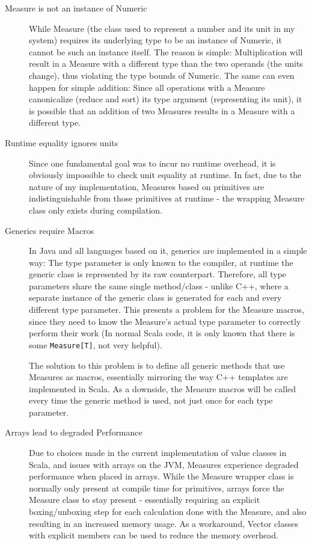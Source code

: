 \documentclass[12pt,oneside,a4paper]{scrbook}
\begin{document}
\begin{description}
  \item[Measure is not an instance of Numeric] While Measure (the class used to represent a number and its unit in my system) requires its underlying type to be an instance of Numeric, it cannot be such an instance itself. The reason is simple: Multiplication will result in a Measure with a different type than the two operands (the units change), thus violating the type bounds of Numeric. The same can even happen for simple addition: Since all operations with a Measure canonicalize (reduce and sort) its type argument (representing its unit), it is possible that an addition of two Measures results in a Measure with a different type.

  \item[Runtime equality ignores units] Since one fundamental goal was to incur no runtime overhead, it is obviously impossible to check unit equality at runtime. In fact, due to the nature of my implementation, Measures based on primitives are indistinguishable from those primitives at runtime - the wrapping Measure class only exists during compilation.

  \item[Generics require Macros] In Java and all languages based on it, generics are implemented in a simple way: The type parameter is only known to the compiler, at runtime the generic class is represented by its raw counterpart. Therefore, all type parameters share the same single method/class - unlike C++, where a separate instance of the generic class is generated for each and every different type parameter. This presents a problem for the Measure macros, since they need to know the Measure's actual type parameter to correctly perform their work (In normal Scala code, it is only known that there is some \verb|Measure[T]|, not very helpful).

  The solution to this problem is to define all generic methods that use Measures as macros, essentially mirroring the way C++ templates are implemented in Scala. As a downside, the Measure macros will be called every time the generic method is used, not just once for each type parameter.

  \item[Arrays lead to degraded Performance] Due to choices made in the current implementation of value classes in Scala, and issues with arrays on the JVM, Measures experience degraded performance when placed in arrays. While the Measure wrapper class is normally only present at compile time for primitives, arrays force the Measure class to stay present - essentially requiring an explicit boxing/unboxing step for each calculation done with the Measure, and also resulting in an increased memory usage. As a workaround, Vector classes with explicit members can be used to reduce the memory overhead.


\end{description}
\end{document}
